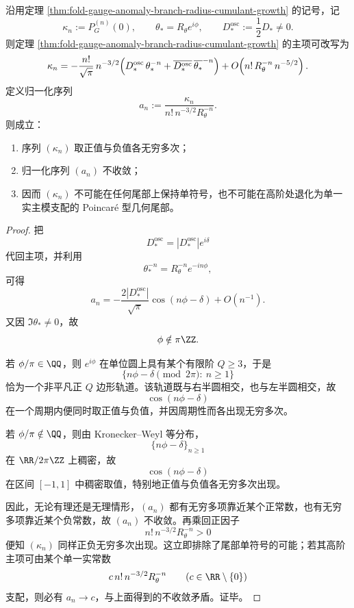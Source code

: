 \begin{theorem}[规范差高阶累积量的无限次符号翻转]\label{thm:fold-gauge-anomaly-cumulants-infinite-sign-flips}
沿用定理 \ref{thm:fold-gauge-anomaly-branch-radius-cumulant-growth} 的记号，记
\[
\kappa_n:=P_G^{(n)}(0),
\qquad
\theta_\ast=R_\theta e^{i\phi},
\qquad
D_\ast^{\mathrm{osc}}:=\frac12 D_\ast\neq 0.
\]
则定理 \ref{thm:fold-gauge-anomaly-branch-radius-cumulant-growth} 的主项可改写为
\[
\kappa_n
=
-\frac{n!}{\sqrt\pi}\,n^{-3/2}
\Bigl(
D_\ast^{\mathrm{osc}}\,\theta_\ast^{-n}
+
\overline{D_\ast^{\mathrm{osc}}}\,\overline{\theta_\ast}^{-n}
\Bigr)
+O\!\left(n!\,R_\theta^{-n}\,n^{-5/2}\right).
\]
定义归一化序列
\[
a_n:=\frac{\kappa_n}{n!\,n^{-3/2}R_\theta^{-n}}.
\]
则成立：
\begin{enumerate}
  \item 序列 \((\kappa_n)\) 取正值与负值各无穷多次；
  \item 归一化序列 \((a_n)\) 不收敛；
  \item 因而 \((\kappa_n)\) 不可能在任何尾部上保持单符号，也不可能在高阶处退化为单一实主模支配的 Poincar\'e 型几何尾部。
\end{enumerate}
\end{theorem}
\begin{proof}
把
\[
D_\ast^{\mathrm{osc}}=|D_\ast^{\mathrm{osc}}|e^{i\delta}
\]
代回主项，并利用
\[
\theta_\ast^{-n}=R_\theta^{-n}e^{-in\phi},
\]
可得
\[
a_n
=
-\frac{2|D_\ast^{\mathrm{osc}}|}{\sqrt\pi}\cos(n\phi-\delta)+O(n^{-1}).
\]
又因 \(\Im\theta_\ast\neq 0\)，故
\[
\phi\notin \pi\ZZ.
\]

若 \(\phi/\pi\in\QQ\)，则 \(e^{i\phi}\) 在单位圆上具有某个有限阶 \(Q\ge 3\)，于是
\[
\{n\phi-\delta\pmod{2\pi}:\ n\ge 1\}
\]
恰为一个非平凡正 \(Q\) 边形轨道。该轨道既与右半圆相交，也与左半圆相交，故
\[
\cos(n\phi-\delta)
\]
在一个周期内便同时取正值与负值，并因周期性而各出现无穷多次。

若 \(\phi/\pi\notin\QQ\)，则由 Kronecker--Weyl 等分布，
\[
\{n\phi-\delta\}_{n\ge 1}
\]
在 \(\RR/2\pi\ZZ\) 上稠密，故
\[
\cos(n\phi-\delta)
\]
在区间 \([-1,1]\) 中稠密取值，特别地正值与负值各无穷多次出现。

因此，无论有理还是无理情形，\((a_n)\) 都有无穷多项靠近某个正常数，也有无穷多项靠近某个负常数，故 \((a_n)\) 不收敛。再乘回正因子
\[
n!\,n^{-3/2}R_\theta^{-n}>0
\]
便知 \((\kappa_n)\) 同样正负无穷多次出现。这立即排除了尾部单符号的可能；若其高阶主项可由某个单一实常数
\[
c\,n!\,n^{-3/2}R_\theta^{-n}
\qquad(c\in\RR\setminus\{0\})
\]
支配，则必有 \(a_n\to c\)，与上面得到的不收敛矛盾。证毕。
\end{proof}

